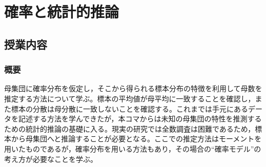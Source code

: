 \section{確率と統計的推論}
\label{b11_estimation}

\subsection{授業内容}
\subsubsection{概要}
母集団に確率分布を仮定し，そこから得られる標本分布の特徴を利用して母数を推定する方法について学ぶ。標本の平均値が母平均に一致することを確認し，また標本の分散は母分散に一致しないことを確認する。これまでは手元にあるデータを記述する方法を学んできたが，本コマからは未知の母集団の特性を推測するための統計的推論の基礎に入る。現実の研究では全数調査は困難であるため，標本から母集団へと推論することが必要となる。ここでの推定方法はモーメントを用いたものであるが，確率分布を用いる方法もあり，その場合の``確率モデル''の考え方が必要なことを学ぶ。

